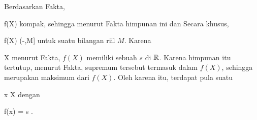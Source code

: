 Berdasarkan
Fakta,

\mavergleichskette
{\vergleichskette
{ f(X)
}
{ \subseteq }{ \R
}
{  }{
}
{    }{
}
{   }{
}
}
{}{}{}
kompak, sehingga menurut
Fakta
himpunan ini
dan
Secara khusus,

\mavergleichskette
{\vergleichskette
{ f(X)
}
{ \subseteq }{ (-\infty,M]
}
{  }{
}
{    }{
}
{   }{
}
}
{}{}{}
untuk suatu bilangan riil $M$. Karena

\mavergleichskette
{\vergleichskette
{ X
}
{ \neq }{ \emptyset
}
{  }{
}
{    }{
}
{   }{
}
}
{}{}{}
menurut
Fakta,
$f(X)$ memiliki sebuah
$s$ di ${\mathbb R}$. Karena himpunan itu tertutup, menurut Fakta,
supremum tersebut termasuk dalam $f(X)$, sehingga merupakan maksimum dari $f(X)$. Oleh karena itu, terdapat pula suatu

\mavergleichskette
{\vergleichskette
{ x
}
{ \in }{ X
}
{  }{
}
{    }{
}
{   }{
}
}
{}{}{}
dengan

\mavergleichskette
{\vergleichskette
{ f(x)
}
{ = }{ s
}
{  }{
}
{    }{
}
{   }{
}
}
{}{}{.}
